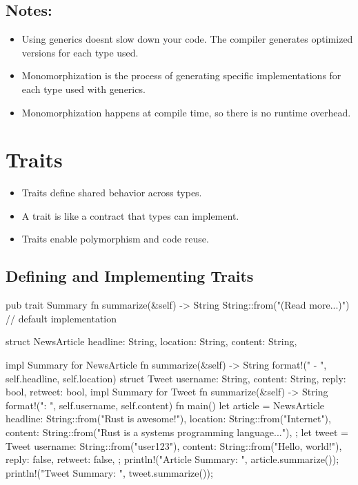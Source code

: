 \documentclass[8pt,a4paper,twocolumn]{extarticle}
\begin{document}
\subsection{Notes:}
\begin{itemize}
  \item Using generics doesnt slow down your code. The compiler generates optimized versions for each type used.
  \item Monomorphization is the process of generating specific implementations for each type used with generics.
  \item Monomorphization happens at compile time, so there is no runtime overhead.
\end{itemize}



\section{Traits}

\begin{itemize}
  \item Traits define shared behavior across types.
  \item A trait is like a contract that types can implement.
  \item Traits enable polymorphism and code reuse.
\end{itemize}

\subsection{Defining and Implementing Traits}
\begin{Code}
  pub trait Summary {
      fn summarize(&self) -> String {
          String::from("(Read more...)") // default implementation
      }
  }

  struct NewsArticle {
      headline: String,
      location: String,
      content: String,
  }

  impl Summary for NewsArticle {
      fn summarize(&self) -> String {
          format!("{} - {}", self.headline, self.location)
      }
  }
  struct Tweet {
      username: String,
      content: String,
      reply: bool,
      retweet: bool,
  }
  impl Summary for Tweet {
      fn summarize(&self) -> String {
          format!("{}: {}", self.username, self.content)
      }
  }
  fn main() {
      let article = NewsArticle {
          headline: String::from("Rust is awesome!"),
          location: String::from("Internet"),
          content: String::from("Rust is a systems programming language..."),
      };
      let tweet = Tweet {
          username: String::from("user123"),
          content: String::from("Hello, world!"),
          reply: false,
          retweet: false,
      };
      println!("Article Summary: {}", article.summarize());
      println!("Tweet Summary: {}", tweet.summarize());
  }
\end{Code}
\end{document}
